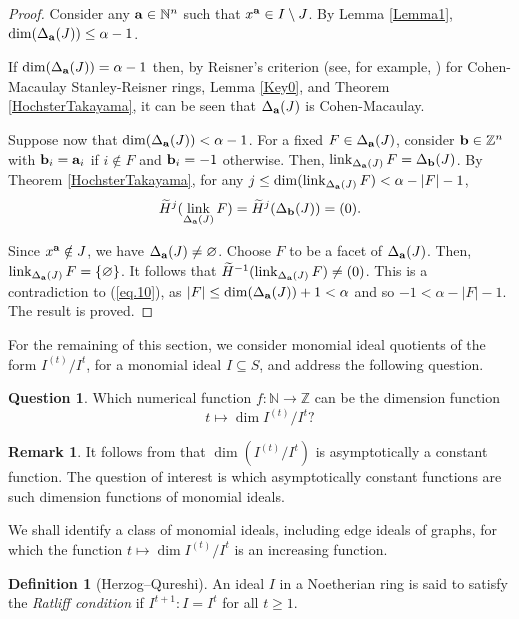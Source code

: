 \documentclass[12pt]{amsart}
\numberwithin{equation}{section}
\theoremstyle{definition}
\newtheorem{definition}[theorem]{Definition}
\newtheorem{quest}[theorem]{Question}
\theoremstyle{definition}
\newtheorem{remark}[theorem]{Remark}
\DeclareMathOperator{\link}{link}
\newcommand{\ZZ}{{\mathbb Z}}
\newcommand{\NN}{{\mathbb N}}
\def\a{{\bold a}}
\def\b{{\bold b}}
\begin{document}
\begin{proof} Consider any $\a\in\NN^n$ such that $x^\a\in I\setminus J$. By Lemma \ref{Lemma1}, $\dim(\Delta_\a(J))\le \alpha-1$. 
	
If $\dim(\Delta_\a(J))=\alpha-1$ then, by Reisner's criterion (see, for example, \cite{Stanley}) for Cohen-Macaulay Stanley-Reisner rings, Lemma \ref{Key0}, and Theorem \ref{HochsterTakayama}, it can be seen that $\Delta_\a(J)$ is Cohen-Macaulay. 

Suppose now that $\dim(\Delta_\a(J))<\alpha-1$. 
For a fixed $F\in \Delta_\a(J)$, consider $\b\in\ZZ^n$ with $\b_i=\a_i$ if $i\notin F$ and $\b_i=-1$ otherwise. Then, $\link_{\Delta_\a(J)}F=\Delta_\b(J)$. 
	By Theorem \ref{HochsterTakayama}, for any $j\le \dim(\link_{\Delta_\a(J)}F)< \alpha-|F|-1$,
\begin{align} 
	\widetilde{H}^{j}(\link_{\Delta_\a(J)}F)=\widetilde{H}^{j}(\Delta_\b(J))=(0). \label{eq.10}
\end{align}

	Since $x^\a\notin J$, we have $\Delta_\a(J)\ne\varnothing$. Choose $F$ to be a facet of $\Delta_\a(J)$. Then, $\link_{\Delta_\a(J)}F=\{\varnothing\}$. It follows that $\widetilde{H}^{-1}(\link_{\Delta_\a(J)}F)\ne (0)$. This is a contradiction to (\ref{eq.10}), as $|F| \le \dim(\Delta_\a(J))+1 < \alpha$ and so $-1< \alpha-|F|-1$. The result is proved.
\end{proof}

For the remaining of this section, we consider monomial ideal quotients of the form $I^{(t)}/I^t$, for a monomial ideal $I \subseteq S$, and address the following question.

\begin{quest} \label{quest.dim}
	Which numerical function $f: \NN \rightarrow \ZZ$ can be the dimension function 
	$$t \mapsto \dim I^{(t)}/I^t?$$ 
\end{quest}

\begin{remark}
	\label{rmk.dim}
	It follows from \cite[Theorem 3.3 and Proposition 5.1]{HPV2008} that $\dim (I^{(t)}/I^t)$ is asymptotically a constant function. The question of interest is which asymptotically constant functions are such dimension functions of monomial ideals.
\end{remark}

We shall identify a class of monomial ideals, including edge ideals of graphs, for which the function $t \mapsto \dim I^{(t)}/I^t$ is an increasing function.

\begin{definition}[Herzog--Qureshi]
An ideal $I$ in a Noetherian ring is said to satisfy the \emph{Ratliff condition} if $I^{t+1} :I = I^t$ for all $t \ge 1$.
\end{definition}
\end{document}
